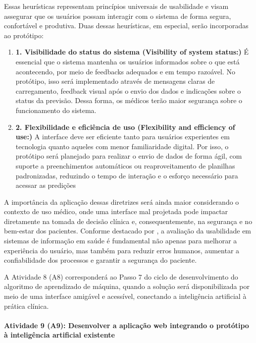 Essas heurísticas representam princípios universais de usabilidade e visam assegurar que os usuários possam interagir com o sistema de forma segura, confortável e produtiva. Duas dessas heurísticas, em especial, serão incorporadas ao protótipo:
\begin{enumerate}
  \item \textbf{1. Visibilidade do status do sistema (Visibility of system status:)} É essencial que o sistema mantenha os usuários informados sobre o que está acontecendo, por meio de feedbacks adequados e em tempo razoável. No protótipo, isso será implementado através de mensagens claras de carregamento, feedback visual após o envio dos dados e indicações sobre o status da previsão. Dessa forma, os médicos terão maior segurança sobre o funcionamento do sistema.

  \item \textbf{2. Flexibilidade e eficiência de uso (Flexibility and efficiency of use:)} A interface deve ser eficiente tanto para usuários experientes em tecnologia quanto aqueles com menor familiaridade digital. Por isso, o protótipo será planejado para realizar o envio de dados de forma ágil, com suporte a preenchimentos automáticos ou reaproveitamento de planilhas padronizadas, reduzindo o tempo de interação e o esforço necessário para acessar as predições
\end{enumerate}

A importância da aplicação dessas diretrizes será ainda maior considerando o contexto de uso médico, onde uma interface mal projetada pode impactar diretamente na tomada de decisão clínica e, consequentemente, na segurança e no bem-estar dos pacientes. Conforme destacado por , a avaliação da usabilidade em sistemas de informação em saúde é fundamental não apenas para melhorar a experiência do usuário, mas também para reduzir erros humanos, aumentar a confiabilidade dos processos e garantir a segurança do paciente.

A Atividade 8 (A8) corresponderá ao Passo 7 do ciclo de desenvolvimento do algoritmo de aprendizado de máquina, quando a solução será disponibilizada por meio de uma interface amigável e acessível, conectando a inteligência artificial à prática clínica.

\paragraph{\textbf{Atividade 9 (A9):}  Desenvolver a aplicação web integrando o protótipo à inteligência artificial existente}

